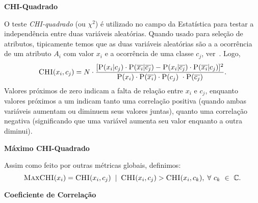 \begin{description}
\item{\textbf{CHI-Quadrado}}
\label{item::chi}

O teste \textit{CHI-quadrado} (ou $\chi^2$) é utilizado no campo da Estatística para testar a independência entre duas variáveis aleatórias. Quando usado para seleção de atributos, tipicamente temos que as duas variáveis aleatórias são a a ocorrência de um atributo $A_i$ com valor $x_i$ e a ocorrência de uma classe $c_j$, ver~\cite{Zheng03}. Logo,
\begin{equation}\label{eqn::chi}
  \textsc{CHI}(x_i, c_j) = N \cdot \frac{ [ \textsc{P}(x_i|c_j) \cdot \textsc{P}(\overline{x_i}|\overline{c_j}) - \textsc{P}(x_i|\overline{c_j}) \cdot \textsc{P}(\overline{x_i}|c_j) ]^2 } {\textsc{P}(x_i) \cdot \textsc{P}(\overline{x_i}) \cdot \textsc{P}(c_j) \ \cdot \textsc{P}(\overline{c_j}) }.
\end{equation}
Valores próximos de zero indicam a falta de relação entre $x_i$ e $c_j$, enquanto valores próximos a um indicam tanto uma correlação positiva (quando ambas variáveis aumentam ou diminuem seus valores juntas), quanto uma correlação negativa (significando que uma variável aumenta seu valor enquanto a outra diminui).

\item{\textbf{Máximo CHI-Quadrado}}
\label{item::maxchi}

Assim como feito por outras métricas globais, definimos:
\begin{equation}\label{eqn::maxchi}
\textsc{MaxCHI}(x_i) = \textsc{CHI}(x_i,c_j) \; \; | \;\; \textsc{CHI}(x_i, c_j) > \textsc{CHI}(x_i, c_k), \; \forall\ c_k\ \in\ \mathbb{C}.
\end{equation}


\item{\textbf{Coeficiente de Correlação}}
\label{item::cc}


\end{description}
